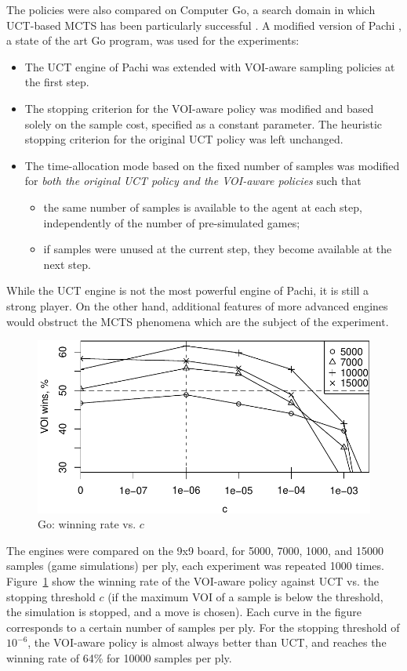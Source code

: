\documentclass[]{article}
\begin{document}
The policies were also compared on Computer Go, a  search domain
in which UCT-based MCTS has been particularly successful
\cite{Gelly.mogo}. A modified version of Pachi \cite{Braudis.pachi}, a state of the art
Go program, was used for the experiments:
\begin{itemize}
\item The UCT engine of Pachi was extended with VOI-aware sampling
  policies at the first step. 
\item The stopping criterion for the VOI-aware policy was
  modified and based solely on the sample cost, specified as
  a constant parameter. The heuristic stopping criterion for the
  original UCT policy was left unchanged.
\item The time-allocation mode based on the fixed number of samples
  was modified for \textit{both the original UCT policy and the VOI-aware
  policies} such that 
  \begin{itemize}
    \item the same number of samples is available to
      the agent at each step, independently of the number of pre-simulated
      games;  
    \item if samples were unused at the current step,
      they become available at the next step. 
  \end{itemize}
\end{itemize}
While the UCT engine is not the most powerful engine of Pachi, it is still a strong
player. On the other hand, additional features of more advanced
engines would obstruct the MCTS phenomena which are the subject of
the experiment.
\begin{figure}[h!]
\centering
\includegraphics[scale=0.6]{uctvoi.pdf}
\caption{Go: winning rate vs. $c$}
\label{fig:uctvoi}
\end{figure}
The engines were compared on the 9x9 board, for 5000, 7000, 1000, and
15000 samples (game simulations) per ply, each experiment was repeated
1000 times. Figure~\ref{fig:uctvoi}
show the winning rate of the VOI-aware policy against UCT
vs. the stopping threshold $c$ (if the maximum VOI of a sample is below
the threshold, the simulation is stopped, and a move is chosen). Each
curve in the figure corresponds to a certain number of samples per
ply. For the stopping threshold of $10^{-6}$, the VOI-aware policy
is almost always better than UCT, and  reaches the winning rate of
64\% for 10000 samples per ply.
\end{document}
